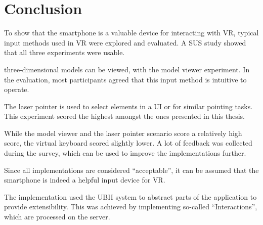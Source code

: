\chapter{Conclusion}\label{chapter:conclusion}

To show that the smartphone is a valuable device for interacting with \gls{VR}, typical input methods used in \gls{VR} were explored and evaluated. A \gls{SUS} study showed that all three experiments were usable. 

three-dimensional models can be viewed, with the model viewer experiment. In the evaluation, most participants agreed that this input method is intuitive to operate.

The laser pointer is used to select elements in a \gls{UI} or for similar pointing tasks. This experiment scored the highest amongst the ones presented in this thesis. 

While the model viewer and the laser pointer scenario score a relatively high score, the virtual keyboard scored slightly lower. A lot of feedback was collected during the survey, which can be used to improve the implementations further.

Since all implementations are considered \enquote{acceptable}, it can be assumed that the smartphone is indeed a helpful input device for \gls{VR}.

The implementation used the \gls{UBII} system to abstract parts of the application to provide extensibility. This was achieved by implementing so-called \enquote{Interactions}, which are processed on the server. 